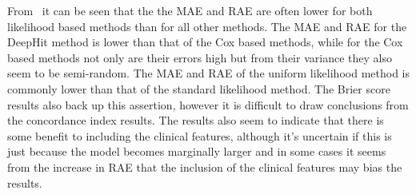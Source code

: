 \begin{table}
    \end{table}

    From~ it can be seen that the the \gls{MAE} and \gls{RAE} are often lower for both likelihood based methods than for all other methods. The \gls{MAE} and \gls{RAE} for the DeepHit method is lower than that of the Cox based methods, while for the Cox based methods not only are their errors high but from their variance they also seem to be semi-random. The \gls{MAE} and \gls{RAE} of the uniform likelihood method is commonly lower than that of the standard likelihood method. The Brier score results also back up this assertion, however it is difficult to draw conclusions from the concordance index results. The results also seem to indicate that there is some benefit to including the clinical features, although it's uncertain if this is just because the model becomes marginally larger and in some cases it seems from the increase in \gls{RAE} that the inclusion of the clinical features may bias the results.
